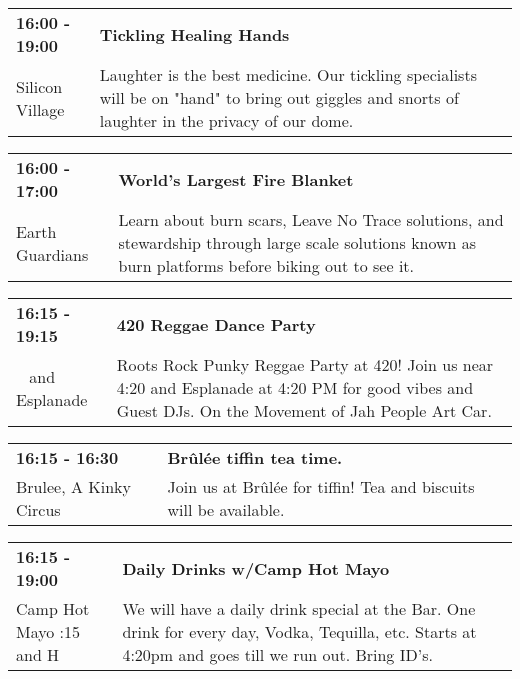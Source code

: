 \begin{tabular}{ p{1in} p{2.2in} }
    \textbf{16:00 - 19:00} & \textbf{Tickling Healing Hands} \\
    Silicon Village \newline  & Laughter is the best medicine. Our tickling specialists will be on "hand" to bring out giggles and snorts of laughter in the privacy of our dome. \\
    \hline 
\end{tabular}
    
\begin{tabular}{ p{1in} p{2.2in} }
    \textbf{16:00 - 17:00} & \textbf{World's Largest Fire Blanket} \\
    Earth Guardians \newline  & Learn about burn scars, Leave No Trace solutions, and stewardship through large scale solutions known as burn platforms before biking out to see it. \\
    \hline 
\end{tabular}
    
\begin{tabular}{ p{1in} p{2.2in} }
    \textbf{16:15 - 19:15} & \textbf{420 Reggae Dance Party} \\
    ~ \newline 420 and Esplanade  & Roots Rock Punky Reggae Party at 420! Join us near 4:20 and Esplanade at 4:20 PM for good vibes and Guest DJs. On the Movement of Jah People Art Car. \\
    \hline 
\end{tabular}
    
\begin{tabular}{ p{1in} p{2.2in} }
    \textbf{16:15 - 16:30} & \textbf{Br\^ul\'ee tiffin tea time.} \\
    Brulee, A Kinky Circus \newline  & Join us at Br\^ul\'ee for tiffin! Tea and biscuits will be available. \\
    \hline 
\end{tabular}
    
\begin{tabular}{ p{1in} p{2.2in} }
    \textbf{16:15 - 19:00} & \textbf{Daily Drinks w/Camp Hot Mayo} \\
    Camp Hot Mayo \newline 9:15 and H & We will have a daily drink special at the Bar.  One drink for every day, Vodka, Tequilla, etc.  Starts at 4:20pm and goes till we run out. Bring ID's. \\
    \hline 
\end{tabular}
    

